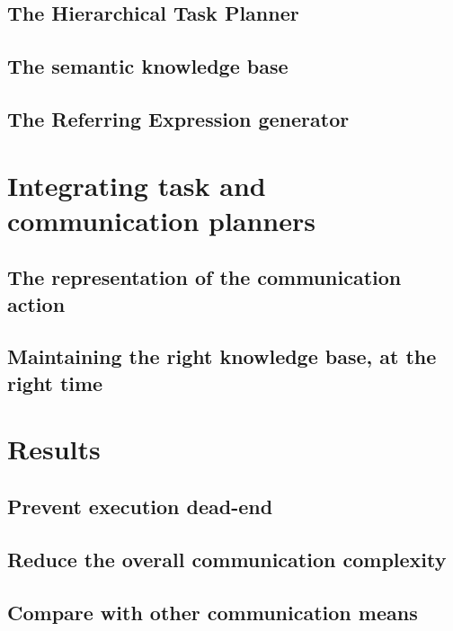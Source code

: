 \subsection{The Hierarchical Task Planner}

\subsection{The semantic knowledge base}

\subsection{The Referring Expression generator}


\section{Integrating task and communication planners}

\subsection{The representation of the communication action}

\subsection{Maintaining the right knowledge base, at the right time}


\section{Results}

\subsection{Prevent execution dead-end}

\subsection{Reduce the overall communication complexity}

\subsection{Compare with other communication means}